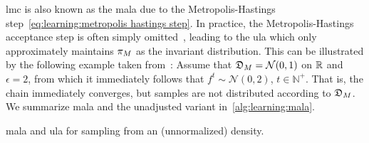 \documentclass[../ml-ct.tex]{subfiles}
\begin{document}
\gls{lmc} is also known as the \gls{mala} due to the Metropolis-Hastings step~\cref{eq:learning:metropolis hastings step}.
In practice, the Metropolis-Hastings acceptance step is often simply omitted~\cite{du_implicit_2019,nijkamp_anatomy_2019}, leading to the \gls{ula} which only approximately maintains \( \pi_{M} \) as the invariant distribution.
This can be illustrated by the following example taken from~\cite{roberts_exponential_1996}:
Assume that \( \mathfrak{D}_{M} = \mathcal{N}(0, 1) \) on \( \mathbb{R} \) and \( \epsilon = 2 \), from which it immediately follows that \( f^t \sim \mathcal{N}(0, 2) \), \( t \in \mathbb{N}^+ \).
That is, the chain immediately converges, but samples are not distributed according to \( \mathfrak{D}_{M} \).
We summarize \gls{mala} and the unadjusted variant in~\cref{alg:learning:mala}.
\begin{algorithm}[t]
	\DontPrintSemicolon
	\caption{\gls{mala} and \gls{ula} for sampling from an (unnormalized) density.}%
	\label{alg:learning:mala}
\end{algorithm}
\end{document}
